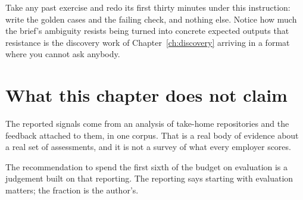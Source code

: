 \begin{drill}
Take any past exercise and redo its first thirty minutes under this
instruction: write the golden cases and the failing check, and nothing else.
Notice how much the brief's ambiguity resists being turned into concrete
expected outputs \dash{} that resistance is the discovery work of
Chapter~\ref{ch:discovery} arriving in a format where you cannot ask anybody.
\end{drill}

\section*{What this chapter does not claim}

The reported signals come from an analysis of take-home repositories and the
feedback attached to them, in one corpus. That is a real body of evidence about
a real set of assessments, and it is not a survey of what every employer scores.

The recommendation to spend the first sixth of the budget on evaluation is a
judgement built on that reporting. The reporting says starting with evaluation
matters; the fraction is the author's.
